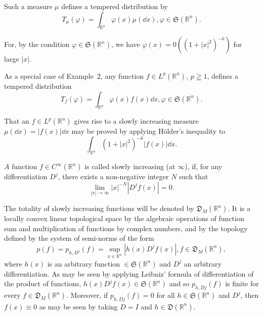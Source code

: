 Such a measure $\mu$ defines a tempered distribution by 
\begin{equation}\label{eq:VI.2.4}
T _{\mu} (\varphi) = \int_ {\mathbb{R}^{n}} \varphi (x) \mu (\dd x), \varphi \in \mathfrak {S} (\mathbb{R}^{n}).
\end{equation}

For, by the condition $\varphi \in \mathfrak{S}(\mathbb{R}^{n})$, we have $\varphi(x) = 0((1 + |x|^2)^{-k})$ for large $|x|$. 

\begin{example}\label{ex:VI.2.Example.3} As a special case of Example~\hyperref[ex:VI.2.Example.2]{$2$}, any function $f \in L^{p}(\mathbb{R}^{n})$, $p \geqq 1$, defines a tempered distribution 
\begin{equation}\tag{4'}\label{eq:VI.2.4'}
T _{f} (\varphi) = \int_ {\mathbb{R}^{n}} \varphi (x) f (x) \dd x, \varphi \in \mathfrak {S} (\mathbb{R}^{n}).
\end{equation}
\end{example}

That an $f \in L^{p}(\mathbb{R}^{n})$ gives rise to a slowly increasing measure $\mu(\dd x) = |f(x)| \dd x$ may be proved by applying Hölder's inequality to 
\[
\int_ {\mathbb{R}^{n}} (1 + | x | ^{2}) ^{-k} | f (x) | \dd x.
\]

\begin{definition}\label{def:VI.2.Definition.2} $A$ function $f \in C^{\infty}(\mathbb{R}^{n})$ is called slowly increasing (at $\infty$), if, for any differentiation $D^{j}$, there exists a non-negative integer $N$ such that 
\begin{equation}\label{eq:VI.2.5}
\lim\limits _{| x | \rightarrow \infty} | x | ^{-N} | D ^{j} f (x) | = 0.
\end{equation}
\end{definition}

The totality of slowly increasing functions will be denoted by $\mathfrak{D}_{M}(\mathbb{R}^{n})$. It is a locally convex linear topological space by the algebraic operations of function sum and multiplication of functions by complex numbers, and by the topology defined by the system of semi-norms of the form 
\begin{equation}\label{eq:VI.2.6}
p (f) = p _ {h, D ^{j}} (f) = \sup\limits _ {x \in \mathbb{R}^{n}} | h (x) D ^{j} f (x) |, f \in \mathfrak {D} _{M} (\mathbb{R}^{n}),
\end{equation}
where $h(x)$ is an arbitrary function $\in \mathfrak{S}(\mathbb{R}^{n})$ and $D^j$ an arbitrary differentiation. As may be seen by applying Leibniz' formula of differentiation of the product of functions, $h(x) D^j f(x) \in \mathfrak{S}(\mathbb{R}^{n})$ and so $p_{h,Dj}(f)$ is finite for every $f \in \mathfrak{D}_M(\mathbb{R}^{n})$. Moreover, if $p_{h,Dj}(f) = 0$ for all $h \in \mathfrak{S}(\mathbb{R}^{n})$ and $D^j$, then $f(x) \equiv 0$ as may be seen by taking $D = I$ and $h \in \mathfrak{D}(\mathbb{R}^{n})$. 

